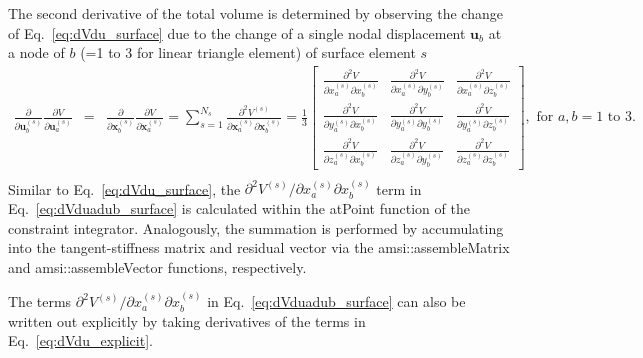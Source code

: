 \documentclass[12pt,aps,pre]{revtex4}
\begin{document}
The second derivative of the total volume is determined by observing the change of Eq.\ \eqref{eq:dVdu_surface} due to the change of a single nodal displacement $\pmb{u}_b$ at a node of $b$ (=1 to 3 for linear triangle element) of surface element $s$
%
\begin{eqnarray}
\frac{\partial}{\partial \pmb{u}_b^{(s)}}\frac{\partial V}{\partial \pmb{u}_a^{(s)}} &=& \frac{\partial}{\partial \pmb{x}_b^{(s)}}\frac{\partial V}{\partial \pmb{x}_a^{(s)}} 
%
=\sum_{s=1}^{N_{s}}\frac{\partial^2 V^{(s)}}{\partial \pmb{x}_a^{(s)} \partial \pmb{x}_b^{(s)}} = 
%
\frac{1}{3}\begin{bmatrix}
\frac{\partial^2 V}{\partial x_a^{(s)} \partial x_b^{(s)}} & \frac{\partial^2 V}{\partial x_a^{(s)} \partial y_b^{(s)}} & \frac{\partial^2 V}{\partial x_a^{(s)} \partial z_b^{(s)}} \\
%
\frac{\partial^2 V}{\partial y_a^{(s)} \partial x_b^{(s)}} & \frac{\partial^2 V}{\partial y_a^{(s)} \partial y_b^{(s)}} & \frac{\partial^2 V}{\partial y_a^{(s)} \partial z_b^{(s)}} \\
%
\frac{\partial^2 V}{\partial z_a^{(s)} \partial x_b^{(s)}} & \frac{\partial^2 V}{\partial z_a^{(s)} \partial y_b^{(s)}} & \frac{\partial^2 V}{\partial z_a^{(s)} \partial z_b^{(s)}} 
\end{bmatrix}, \text{ for } a,b = 1 \text{ to } 3. \nonumber\\
\label{eq:dVduadub_surface}
\end{eqnarray}
%
Similar to Eq.\ \eqref{eq:dVdu_surface}, the $\partial ^2 V^{(s)}/\partial x_a^{(s)}\partial x_b^{(s)}$ term in Eq.\ \eqref{eq:dVduadub_surface} is calculated within the atPoint function of the constraint integrator. Analogously, the summation is performed by accumulating into the tangent-stiffness matrix and residual vector via the amsi::assembleMatrix and amsi::assembleVector functions, respectively.

The terms $\partial ^2 V^{(s)}/\partial x_a^{(s)}\partial x_b^{(s)}$ in Eq.\ \eqref{eq:dVduadub_surface} can also be written out explicitly by taking derivatives of the terms in Eq.\ \eqref{eq:dVdu_explicit}. 
\end{document}

